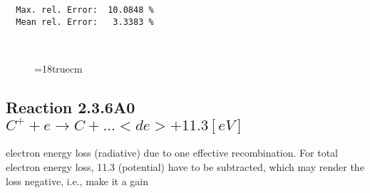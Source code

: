 \begin{verbatim}
  Max. rel. Error:  10.0848 %
  Mean rel. Error:   3.3383 %



\end{verbatim}
\begin{figure} \label{2.3.6il1}
\epsfxsize=18truecm
\end{figure}
\newpage

\subsection{
  Reaction 2.3.6A0 $C^+ + e \rightarrow C     + ...   <de>+11.3 [eV] $
}

  electron energy loss (radiative) due to one effective recombination.
  For total electron energy loss, 11.3 (potential) have to be
  subtracted, which may render the loss negative, i.e., make it a gain

